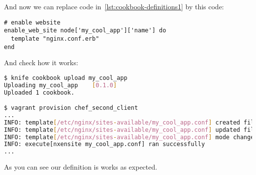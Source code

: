 And now we can replace code in~\ref{lst:cookbook-definitions1} by this code:

\begin{lstlisting}[label=lst:cookbook-definitions-default2,title=my-server-cloud/site-cookbooks/my\_cool\_app/recipes/default.rb]
# enable website
enable_web_site node['my_cool_app']['name'] do
  template "nginx.conf.erb"
end
\end{lstlisting}

And check how it works:

\begin{lstlisting}[language=Bash,label=lst:cookbook-definitions-shell1]
$ knife cookbook upload my_cool_app
Uploading my_cool_app    [0.1.0]
Uploaded 1 cookbook.

$ vagrant provision chef_second_client
...
INFO: template[/etc/nginx/sites-available/my_cool_app.conf] created file /etc/nginx/sites-available/my_cool_app.conf
INFO: template[/etc/nginx/sites-available/my_cool_app.conf] updated file contents /etc/nginx/sites-available/my_cool_app.conf
INFO: template[/etc/nginx/sites-available/my_cool_app.conf] mode changed to 644
INFO: execute[nxensite my_cool_app.conf] ran successfully
...
\end{lstlisting}

As you can see our definition is works as expected.